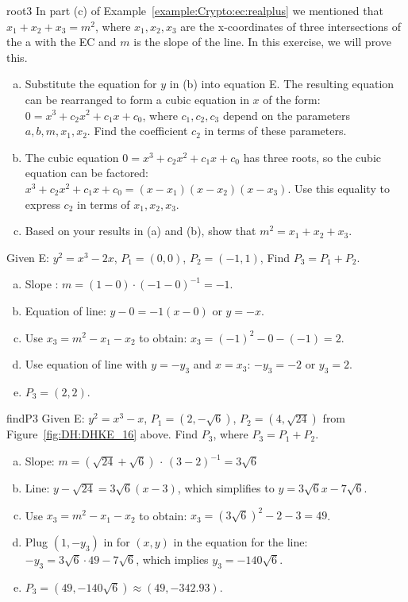 \begin{exercise}{root3}
In part (c) of Example~\ref{example:Crypto:ec:realplus} we mentioned that $x_1+x_2+x_3=m^2$, where $x_1,x_2,x_3$ are the x-coordinates of three intersections of the a with the EC and $m$ is the slope of the line.  In this exercise, we will prove this.
\begin{enumerate}[(a)]
\item
Substitute the equation for $y$ in (b) into equation E. The resulting equation can be rearranged to form a cubic equation in $x$ of the form: $0 = x^3 + c_2 x^2 + c_1 x + c_0$, where $c_1, c_2, c_3$ depend on the parameters $a,b,m,x_1,x_2$. Find the coefficient $c_2$ in terms of these parameters.
\item
The cubic equation $0 = x^3 + c_2 x^2 + c_1 x + c_0$ has three roots, so the cubic equation can be factored:  $x^3 + c_2 x^2 + c_1 x + c_0 = (x-x_1)(x-x_2)(x-x_3)$. Use this equality to express $c_2$ in terms of $x_1, x_2, x_3$.
\item
Based on your results in (a) and (b), show that $m^2 = x_1 + x_2 + x_3$.
\end{enumerate}
\end{exercise}

\begin{example}{} 
Given E: $y^2 = x^3 - 2x$, $P_1 = (0,0)$, $P_2 = (-1,1)$, Find $P_3=P_1 + P_2$.
		
\begin{enumerate}[(a)]
\item
Slope :
$ m =(1 - 0) \cdot (-1- 0)^{-1}=-1$.
\item
Equation of line:	$y - 0 = -1(x- 0)$ or $y =-x $.
\item
Use $x_3 = m^2 - x_1 - x_2$ to obtain: $x_3 = (-1)^2 - 0 - (-1) = 2$.
\item
Use equation of line with $y=-y_3$ and $x=x_3$:  $-y_3 = -2$ or $y_3=2$.
\item
$P_3 = (2,2)$.
\end{enumerate}
\end{example}
\begin{example}{findP3} Given E: $y^2 = x^3 - x$, $P_1 = (2, -\sqrt{6})$, $P_2 = (4, \sqrt{24})$ from Figure~\ref{fig:DH:DHKE_16} above.
	Find $P_3$, where $P_3 = P_1 + P_2$.
\begin{enumerate}[(a)]
\item 
Slope: $m =( \sqrt{24}+\sqrt{6})$ $\cdot$ $(3-2)^{-1} = 3\sqrt{6}  $ \\
\item
Line: $y - \sqrt{24} = 3\sqrt{6}(x - 3)$, which simplifies to $y = 3\sqrt{6}x - 7\sqrt{6}$.
\item 
Use $x_3 = m^2 - x_1 - x_2$ to obtain: $x_3 = (3\sqrt{6})^2 - 2 - 3 = 49$.
\item
Plug $(1,-y_3)$ in for $(x,y)$ in the equation for the line: $-y_3 = 3\sqrt{6}\cdot 49 -7 \sqrt{6}$, which implies $y_3 = -140\sqrt{6}$. 
\item
$P_3 = (49,-140\sqrt{6}) \approx (49,-342.93)$.
\end {enumerate}  
\end{example}

